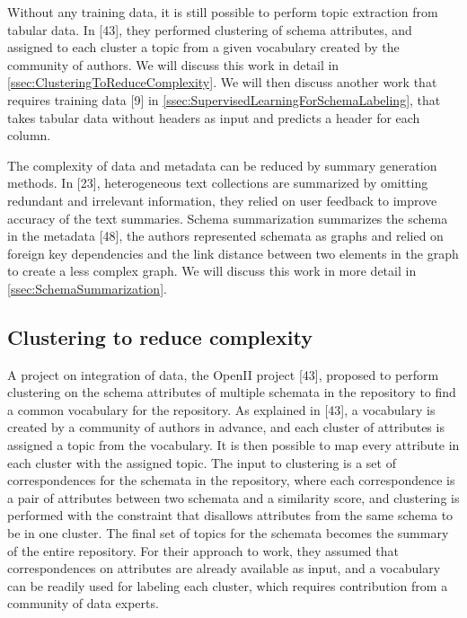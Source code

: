 Without any training data, it is still possible to perform topic extraction from tabular data. In \cite{Smith2011Unity}[43], they performed clustering of schema attributes, and assigned to each cluster a topic from a given vocabulary created by the community of authors. We will discuss this work in detail in \autoref{ssec:ClusteringToReduceComplexity}. We will then discuss another work that requires training data \cite{10.1145/3184558.3191601}[9] in \autoref{ssec:SupervisedLearningForSchemaLabeling}, that takes tabular data without headers as input and predicts a header for each column.

The complexity of data and metadata can be reduced by summary generation methods. In \cite{Benjamin2019Interactive}[23], heterogeneous text collections are summarized by omitting redundant and irrelevant information, they relied on user feedback to improve accuracy of the text summaries. Schema summarization summarizes the schema in the metadata \cite{Yu2006Schema}[48], the authors represented schemata as graphs and relied on foreign key dependencies and the link distance between two elements in the graph to create a less complex graph. We will discuss this work in more detail in \autoref{ssec:SchemaSummarization}.

\subsection{Clustering to reduce complexity}
\label{ssec:ClusteringToReduceComplexity}

A project on integration of data, the OpenII project \cite{Smith2011Unity}[43], proposed to perform clustering on the schema attributes of multiple schemata in the repository to find a common vocabulary for the repository. As explained in \cite{Smith2011Unity}[43], a vocabulary is created by a community of authors in advance, and each cluster of attributes is assigned a topic from the vocabulary. It is then possible to map every attribute in each cluster with the assigned topic. The input to clustering is a set of correspondences for the schemata in the repository, where each correspondence is a pair of attributes between two schemata and a similarity score, and clustering is performed with the constraint that disallows attributes from the same schema to be in one cluster. The final set of topics for the schemata becomes the summary of the entire repository. For their approach to work, they assumed that correspondences on attributes are already available as input, and a vocabulary can be readily used for labeling each cluster, which requires contribution from a community of data experts.


